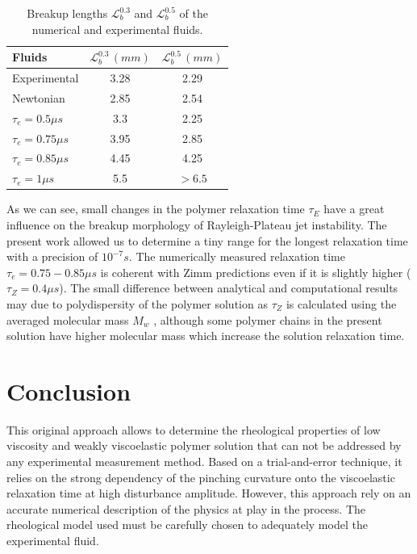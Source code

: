\documentclass[twocolumn,10pt]{asme2ej}
\begin{document}
\begin{table}[H]
    \begin{center}
        \begin{tabular}{l|cc}
            Fluids & $\mathcal{L}^{0.3}_b\,(mm)$ &$\mathcal{L}^{0.5}_b\,(mm)$\\
            \hline
            Experimental  & 3.28  &2.29 \\
            Newtonian & 2.85 & 2.54\\ 
            $\tau_e = 0.5\mu s$ & 3.3 & 2.25\\ 
            $\tau_e = 0.75\mu s$ & 3.95 & 2.85\\ 
            $\tau_e = 0.85\mu s$ & 4.45 & 4.25\\ 
            $\tau_e = 1\mu s$ & 5.5 & $> 6.5$\\ 
            \hline
        \end{tabular}
    \end{center}
    \label{tab:lbInk}
    \caption{Breakup lengths $\mathcal{L}^{0.3}_b$ and $\mathcal{L}^{0.5}_b$ of the numerical and experimental fluids.}
\end{table}


As we can see, small changes in the polymer relaxation time $\tau_E$ have a great influence on the breakup morphology of Rayleigh-Plateau jet instability. The present work allowed us to determine a tiny range for the longest relaxation time with a precision of $10^{-7} s$. The numerically measured relaxation time $\tau_e = 0.75-0.85 \mu s$ is coherent with Zimm predictions even if it is slightly higher ($\tau_Z = 0.4 \mu s$).  The small difference between analytical and computational results may due to polydispersity of the polymer solution as $\tau_Z$ is calculated using the averaged molecular mass $M_w$ , although some
polymer chains in the present solution have higher molecular mass which increase the solution relaxation time.

\section{Conclusion}
This original approach allows to determine the rheological properties of low viscosity and weakly viscoelastic polymer solution that can not be addressed by any experimental measurement method. Based on a trial-and-error technique, it relies on the strong dependency of the pinching curvature onto the viscoelastic relaxation time at high disturbance amplitude. However, this approach rely on an accurate numerical description of the physics at play in the process. The rheological model used must be carefully chosen to adequately model the experimental fluid.



\end{document}
